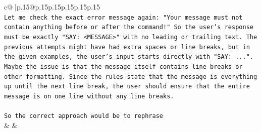 \documentclass{article}
\begin{document}
{\begin{supertabular}{c@{$\;$}|p{.15\linewidth}@{}p{.15\linewidth}p{.15\linewidth}p{.15\linewidth}p{.15\linewidth}p{.15\linewidth}}
{{{\\ 
\texttt{Let me check the exact error message again: "Your message must not contain anything before or after the command!" So the user's response must be exactly "SAY: <MESSAGE>" with no leading or trailing text. The previous attempts might have had extra spaces or line breaks, but in the given examples, the user's input starts directly with "SAY: ...". Maybe the issue is that the message itself contains line breaks or other formatting. Since the rules state that the message is everything up until the next line break, the user should ensure that the entire message is on one line without any line breaks.} \\
\\ 
\texttt{So the correct approach would be to rephrase} \\
            }
        }
    }
    & & \\ \\


\end{supertabular}}
\end{document}
